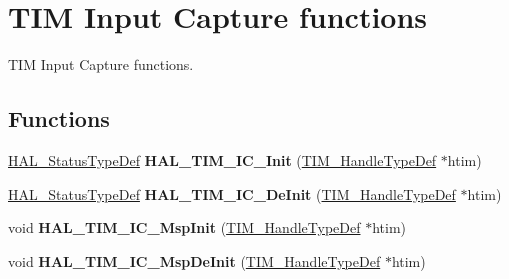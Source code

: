 \hypertarget{group___t_i_m___exported___functions___group4}{}\section{T\+IM Input Capture functions}
\label{group___t_i_m___exported___functions___group4}


T\+IM Input Capture functions.  


\subsection*{Functions}
\begin{DoxyCompactItemize}
\item 
\mbox{\label{group___t_i_m___exported___functions___group4_ga342aa1098891f55f59c7867afff589c1}} 
\mbox{\hyperlink{stm32f7xx__hal__def_8h_a63c0679d1cb8b8c684fbb0632743478f}{H\+A\+L\+\_\+\+Status\+Type\+Def}} {\bfseries H\+A\+L\+\_\+\+T\+I\+M\+\_\+\+I\+C\+\_\+\+Init} (\mbox{\hyperlink{struct_t_i_m___handle_type_def}{T\+I\+M\+\_\+\+Handle\+Type\+Def}} $\ast$htim)
\item 
\mbox{\label{group___t_i_m___exported___functions___group4_ga2fc9af96c4ec45ba9057e182012f3586}} 
\mbox{\hyperlink{stm32f7xx__hal__def_8h_a63c0679d1cb8b8c684fbb0632743478f}{H\+A\+L\+\_\+\+Status\+Type\+Def}} {\bfseries H\+A\+L\+\_\+\+T\+I\+M\+\_\+\+I\+C\+\_\+\+De\+Init} (\mbox{\hyperlink{struct_t_i_m___handle_type_def}{T\+I\+M\+\_\+\+Handle\+Type\+Def}} $\ast$htim)
\item 
\mbox{\label{group___t_i_m___exported___functions___group4_ga202723f23bc46b29b16145f9cceabbbb}} 
void {\bfseries H\+A\+L\+\_\+\+T\+I\+M\+\_\+\+I\+C\+\_\+\+Msp\+Init} (\mbox{\hyperlink{struct_t_i_m___handle_type_def}{T\+I\+M\+\_\+\+Handle\+Type\+Def}} $\ast$htim)
\item 
\mbox{\label{group___t_i_m___exported___functions___group4_gad1aa484ec0f0559908d9d8128614e7ad}} 
void {\bfseries H\+A\+L\+\_\+\+T\+I\+M\+\_\+\+I\+C\+\_\+\+Msp\+De\+Init} (\mbox{\hyperlink{struct_t_i_m___handle_type_def}{T\+I\+M\+\_\+\+Handle\+Type\+Def}} $\ast$htim)
\item 

\end{DoxyCompactItemize}
